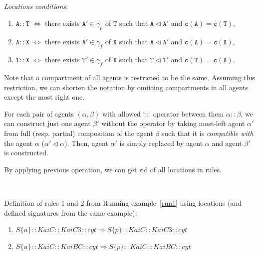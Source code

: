 \documentclass[12pt]{fithesis2}
\begin{document}
\begin{definition}\label{locations:conditions}
\emph{Locations conditions.}

\begin{enumerate}
 \item $\mathtt{A}::\mathtt{T}$ $\Leftrightarrow$ there exists $\mathtt{A}' \in \gamma_p$ of $\mathtt{T}$ such that $\mathtt{A} \lhd \mathtt{A}'$ and $\mathtt{c}(\mathtt{A}) = \mathtt{c}(\mathtt{T})$,

\item $\mathtt{A}::\mathtt{X}$ $\Leftrightarrow$ there exists $\mathtt{A}' \in \gamma_f$ of $\mathtt{X}$ such that $\mathtt{A} \lhd \mathtt{A}'$ and $\mathtt{c}(\mathtt{A}) = \mathtt{c}(\mathtt{X})$,

\item $\mathtt{T}::\mathtt{X}$ $\Leftrightarrow$ there exists $\mathtt{T}' \in \gamma_f$ of $\mathtt{X}$ such that $\mathtt{T} \lhd \mathtt{T}'$ and $\mathtt{c}(\mathtt{T}) = \mathtt{c}(\mathtt{X})$.
\end{enumerate}
\end{definition}

\begin{notation}
Note that a compartment of all agents is restricted to be the same. Assuming this restriction, we can shorten the notation by omitting compartments in all agents except the most right one.
\end{notation}

For each pair of agents $(\alpha, \beta)$ with allowed `::' operator between them $\alpha :: \beta$, we can construct just one agent $\beta'$ without the operator by taking most-left agent $\alpha'$ from full (resp. partial) composition of the agent $\beta$ such that it is \emph{compatible with} the agent $\alpha$ ($\alpha' \lhd \alpha$). Then, agent $\alpha'$ is simply replaced by agent $\alpha$ and agent $\beta'$ is constructed.

By applying previous operation, we can get rid of all locations in rules.

\begin{runningExample}\label{run4}
$ $

\noindent Definition of rules 1 and 2 from Running example~\ref{run1} using locations (and defined signatures from the same example):
\begin{enumerate}
\item $S\{u\}::KaiC::KaiC3::cyt \Rightarrow S\{p\}::KaiC::KaiC3::cyt$
\item $S\{u\}::KaiC::KaiBC::cyt \Rightarrow S\{p\}::KaiC::KaiBC::cyt$
\end{enumerate}
\end{runningExample}
\end{document}
